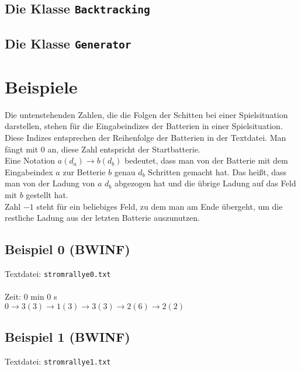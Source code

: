 \documentclass[a4paper,10pt,ngerman]{scrartcl}
\begin{document}
\subsection{Die Klasse \texttt{Backtracking}}

\subsection{Die Klasse \texttt{Generator}}

\newpage
\section{Beispiele}
Die untenstehenden Zahlen, die die Folgen der Schitten bei einer Spielsituation darstellen, stehen für die Eingabeindizes
der Batterien in einer Spielsituation. Diese Indizes entsprechen der Reihenfolge der Batterien in der Textdatei. Man fängt mit 0 an,
diese Zahl entspricht der Startbatterie.\\
Eine Notation $a(d_a) \rightarrow b(d_b)$ bedeutet, dass man von der Batterie mit dem Eingabeindex $a$ zur Betterie $b$ genau $d_b$ Schritten
gemacht hat. Das heißt, dass man von der Ladung von $a$ $d_b$ abgezogen hat und die übrige Ladung auf das Feld mit $b$ gestellt hat.\\
Zahl $-1$ steht für ein beliebiges Feld, zu dem man am Ende übergeht, um die restliche Ladung aus der letzten Batterie auszunutzen.

\subsection{Beispiel 0 (BWINF)}\label{example:0}
Textdatei: \texttt{stromrallye0.txt}\\

\noindent
{}\\

\noindent
Zeit: 0 min 0 s\\

\noindent
$0 \rightarrow3(3) \rightarrow 1(3) \rightarrow 3(3) \rightarrow 2(6) \rightarrow 2(2)$

\subsection{Beispiel 1 (BWINF)}\label{example:1}
Textdatei: \texttt{stromrallye1.txt}\\

\noindent
{}\\
\end{document}
